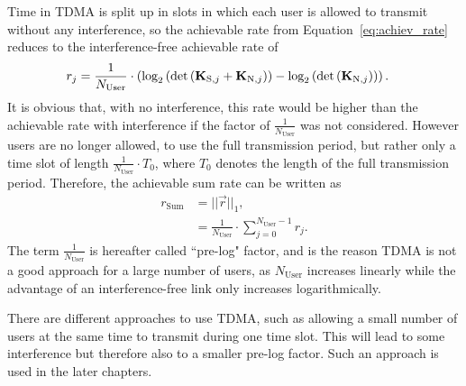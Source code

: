 Time in TDMA is split up in slots in which each user is allowed to transmit without any interference, so the achievable rate from Equation~\eqref{eq:achiev_rate} reduces to the interference-free achievable rate of 
\begin{align}
\label{eq:tdma_achiev_rate}
r_j  &=\frac{1}{N_\text{User}}\cdot\left(
		\text{log}_2\left(\text{det}\left(\mathbf{K}_{\text{S},j}+\mathbf{K}_{\text{N},j}\right)\right) -
	     	\text{log}_2\left(\text{det}\left(\mathbf{K}_{\text{N},j}\right)\right)\right).
\end{align}
It is obvious that, with no interference, this rate would be higher than the achievable rate with interference if the factor of $\frac{1}{N_\text{User}}$ was not considered.
However users are no longer allowed, to use the full transmission period, but rather only a time slot of length $\frac{1}{N_\text{User}}\cdot T_0$, where $T_0$ denotes the length of the full transmission period.
Therefore, the achievable sum rate can be written as
\begin{align}
\label{eq:tdma_achiev_sum_rate}
\nonumber
r_\text{Sum} &= ||\vec{r}||_1,\\
&= \frac{1}{N_\text{User}}\cdot \sum_{j=0}^{N_\text{User}-1} r_j.
\end{align}
The term $\frac{1}{N_\text{User}}$ is hereafter called ``pre-log" factor, and is the reason TDMA is not a good approach for a large number of users, as $N_\text{User}$ increases linearly while the advantage of an interference-free link only increases logarithmically.

There are different approaches to use TDMA, such as allowing a small number of users at the same time to transmit during one time slot.
This will lead to some interference but therefore also to a smaller pre-log factor.
Such an approach is used in the later chapters.





